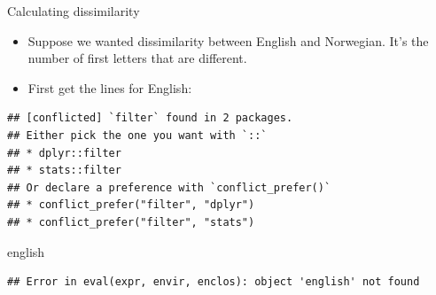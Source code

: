 \documentclass[ignorenonframetext,]{beamer}
\newenvironment{Shaded}{\begin{snugshade}}{\end{snugshade}}
\newcommand{\KeywordTok}[1]{\textcolor[rgb]{0.13,0.29,0.53}{\textbf{#1}}}
\newcommand{\NormalTok}[1]{#1}
\newcommand{\OperatorTok}[1]{\textcolor[rgb]{0.81,0.36,0.00}{\textbf{#1}}}
\newcommand{\StringTok}[1]{\textcolor[rgb]{0.31,0.60,0.02}{#1}}
\begin{document}
\begin{frame}[fragile]{Calculating dissimilarity}
\protect\hypertarget{calculating-dissimilarity}{}

\begin{itemize}
\item
  Suppose we wanted dissimilarity between English and Norwegian. It's
  the number of first letters that are different.
\item
  First get the lines for English:
\end{itemize}

\begin{Shaded}
\end{Shaded}

\begin{verbatim}
## [conflicted] `filter` found in 2 packages.
## Either pick the one you want with `::` 
## * dplyr::filter
## * stats::filter
## Or declare a preference with `conflict_prefer()`
## * conflict_prefer("filter", "dplyr")
## * conflict_prefer("filter", "stats")
\end{verbatim}

\begin{Shaded}
\begin{Highlighting}[]
\NormalTok{english}
\end{Highlighting}
\end{Shaded}

\begin{verbatim}
## Error in eval(expr, envir, enclos): object 'english' not found
\end{verbatim}

\end{frame}
\end{document}
